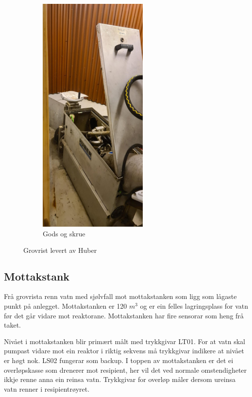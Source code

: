 \begin{figure}[htbp]
\begin{subfigure}[b]{0.3\textwidth}
        \includegraphics[angle=-90,width=0.6\textwidth]{Bilder/Huber2.JPG}
        \caption{Gods og skrue}\label{fig:Huber2}
    \end{subfigure}
    \caption{Grovrist levert av Huber}\label{fig:HuberGrovrist}
\end{figure}

\newpage
\subsection{Mottakstank}
Frå grovrista renn vatn med sjølvfall mot mottakstanken som ligg som lågaste punkt på anlegget.
Mottakstanken er 120 $m^3$ og er ein felles lagringsplass for vatn før det går vidare mot reaktorane.
Mottakstanken har fire sensorar som heng frå taket.

Nivået i mottakstanken blir primært målt med trykkgivar LT01. For at vatn skal pumpast vidare mot ein
reaktor i riktig sekvens må trykkgivar indikere at nivået er høgt nok. LS02 fungerar som backup. \newline
I toppen av mottakstanken er det ei overløpskasse som drenerer mot resipient, her vil det
ved normale omstendigheter ikkje renne anna ein reinsa vatn. Trykkgivar for overløp måler
dersom ureinsa vatn renner i resipientrøyret.


